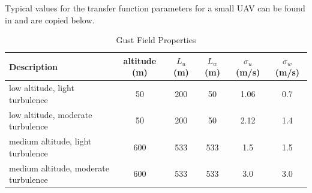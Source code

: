 Typical values for the transfer function parameters for a small UAV can be found in \cite{Langelaan2011} and are copied below.
\begin{table}[H]
\centering
\begin{tabular}{|p{5cm}|c|c|c|c|c|}
	\hline
	            Description              & altitude (m) & $L_u$ (m) & $L_w$  (m) & $\sigma _u$ (m/s) & $\sigma _w$ (m/s) \\ \hline
	   low altitude, light turbulence    &      50      &    200    &     50     &       1.06       &       0.7        \\ \hline
	 low altitude, moderate turbulence   &      50      &    200    &     50     &       2.12       &       1.4        \\ \hline
	 medium altitude, light turbulence   &     600      &    533    &    533     &       1.5        &       1.5        \\ \hline
	medium altitude, moderate turbulence &     600      &    533    &    533     &       3.0        &       3.0        \\ \hline
\end{tabular} 
\caption{Gust Field Properties}
\end{table}